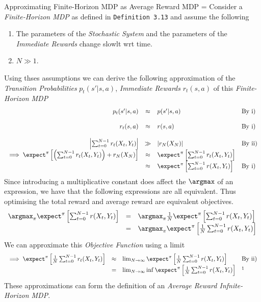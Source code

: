 \documentclass[11pt,a4paper]{article}
\begin{document}
  \begin{proposition}{Approximating Finite-Horizon MDP as Average Reward MDP}
    \everymath={\displaystyle}
    Consider a \textit{Finite-Horizon MDP} as defined in \texttt{Definition 3.13} and assume the following
    \begin{enumerate}
      \item The parameters of the \textit{Stochastic System} and the parameters of the \textit{Immediate Rewards} change slowlt wrt time.
      \item $N\gg1$.
    \end{enumerate}
    Using thses assumptions we can derive the following approximation of the \textit{Transition Probabilities} $p_t(s'|s,a)$, \textit{Immediate Rewards} $r_t(s,a)$ of this \textit{Finite-Horizon MDP}
    \[\begin{array}{rcll}
      p_t(s'|s,a)&\approx&p(s'|s,a)&\text{By i)}\\
      \\
      r_t(s,a)&\approx&r(s,a)&\text{By i)}\\
      \\
      \left|\sum_{t=0}^{N-1}r_t(X_t,Y_t)\right|&\gg&|r_N(X_N)|&\text{By ii)}\\
      \implies\expect^\pi\left[\left(\sum_{t=0}^{N-1}r_t(X_t,Y_t)\right)+r_N(X_N)\right]&\approx&\expect^\pi\left[\sum_{t=0}^{N-1}r_t(X_t,Y_t)\right]\\
      &\approx&\expect^\pi\left[\sum_{t=0}^{N-1}r(X_t,Y_t)\right]&\text{By i)}
    \end{array}\]
    Since introducing a multiplicative constant does affect the $\argmax$ of an expression, we have that the following expressions are all equivalent. Thus optimising the total reward and average reward are equivalent objectives.
    \[\begin{array}{rcl}
    \argmax_\pi\expect^\pi\left[\sum_{t=0}^{N-1}r(X_t,Y_t)\right]&=&\argmax_\pi\frac1N\expect^\pi\left[\sum_{t=0}^{N-1}r(X_t,Y_t)\right]\\
    &=&\argmax_\pi\expect^\pi\left[\frac1N\sum_{t=0}^{N-1}r(X_t,Y_t)\right]\\
    \end{array}\]
    We can approximate this \textit{Objective Function} using a limit
    \[\begin{array}{rcll}
      \implies\expect^\pi\left[\frac1N\sum_{t=0}^{N-1}r_t(X_t,Y_t)\right]&\approx&\lim_{N\to\infty}\expect^\pi\left[\frac1N\sum_{t=0}^{N-1}r(X_t,Y_t)\right]&\text{By ii)}\\
      &=&\lim_{N\to\infty}\inf\expect^\pi\left[\frac1N\sum_{t=0}^{N-1}r(X_t,Y_t)\right]&\footnotemark
    \end{array}\]
    These approximations can form the definition of an \textit{Average Reward Infnite-Horizon MDP}.
  \end{proposition}
\end{document}
